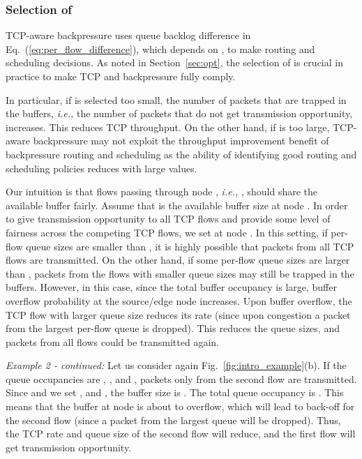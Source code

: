 \documentclass[conference]{IEEEtran}
\newcommand{\ie}{{\em i.e., }}
\begin{document}
\subsubsection{Selection of }
TCP-aware backpressure uses queue backlog difference in Eq.~(\ref{eq:per_flow_difference}), which depends on , to make routing and scheduling decisions. As noted in Section~\ref{sec:opt}, the selection of  is crucial in practice to make TCP and backpressure fully comply.

In particular, if  is selected too small, the number of packets that are trapped in the buffers, \ie the number of packets that do not get transmission opportunity, increases. This reduces TCP throughput. On the other hand, if  is too large, TCP-aware backpressure may not exploit the throughput improvement benefit of backpressure routing and scheduling as the ability of identifying good routing and scheduling policies reduces with large  values.



Our intuition is that flows passing through node , \ie , should share the available buffer fairly. Assume that  is the available buffer size at node . In order to give transmission opportunity to all TCP flows and provide some level of fairness across the competing TCP flows, we set  at node . In this setting, if per-flow queue sizes are smaller than , it is highly possible that packets from all TCP flows are transmitted. On the other hand, if some per-flow queue sizes are larger than , packets from the flows with smaller queue sizes may still be trapped in the buffers. However, in this case, since the total buffer occupancy is large, buffer overflow probability at the source/edge node increases. Upon buffer overflow, the TCP flow with larger queue size reduces its rate (since upon congestion a packet from the largest per-flow queue is dropped). This reduces the queue sizes, and packets from all flows could be transmitted again.

{\em Example 2 - continued:} Let us consider again Fig.~\ref{fig:intro_example}(b). If the queue occupancies are , , and , packets only from the second flow are transmitted. Since  and we set , and , the buffer size is . The total queue occupancy is  . This means that the buffer at node  is about to overflow, which will lead to back-off for the second flow (since a packet from the largest queue will be dropped). Thus, the TCP rate and queue size of the second flow will reduce, and the first flow will get transmission opportunity. \hfill 
\end{document}
